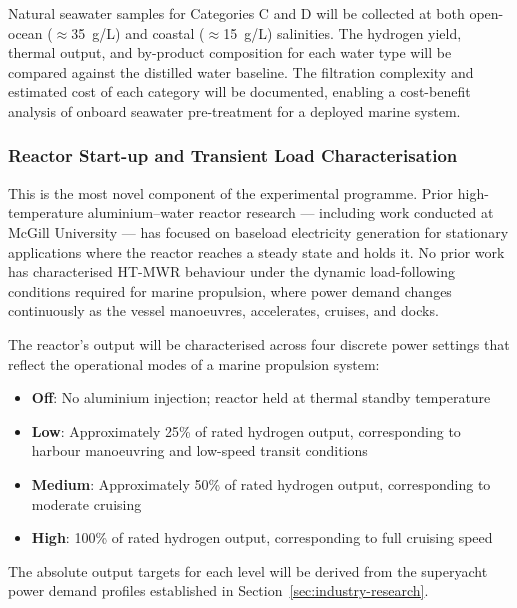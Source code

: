 \documentclass[12pt]{article}
\begin{document}
Natural seawater samples for Categories C and D will be collected at both 
open-ocean (${\approx}$35~g/L) and coastal (${\approx}$15~g/L) salinities. The 
hydrogen yield, thermal output, and by-product composition for each water type will 
be compared against the distilled water baseline. The filtration complexity and 
estimated cost of each category will be documented, enabling a cost-benefit analysis 
of onboard seawater pre-treatment for a deployed marine system.

\subsubsection*{Reactor Start-up and Transient Load Characterisation}

This is the most novel component of the experimental programme. Prior 
high-temperature aluminium--water reactor research --- including work conducted at 
McGill University --- has focused on baseload electricity generation for stationary 
applications where the reactor reaches a steady state and holds it. No prior work 
has characterised HT-MWR behaviour under the dynamic load-following conditions 
required for marine propulsion, where power demand changes continuously as the 
vessel manoeuvres, accelerates, cruises, and docks.

The reactor's output will be characterised across four discrete power settings that 
reflect the operational modes of a marine propulsion system:

\begin{itemize}
    \item \textbf{Off}: No aluminium injection; reactor held at thermal standby 
    temperature

    \item \textbf{Low}: Approximately 25\% of rated hydrogen output, corresponding 
    to harbour manoeuvring and low-speed transit conditions

    \item \textbf{Medium}: Approximately 50\% of rated hydrogen output, 
    corresponding to moderate cruising

    \item \textbf{High}: 100\% of rated hydrogen output, corresponding to full 
    cruising speed
\end{itemize}

The absolute output targets for each level will be derived from the superyacht power 
demand profiles established in Section~\ref{sec:industry-research}.
\end{document}
